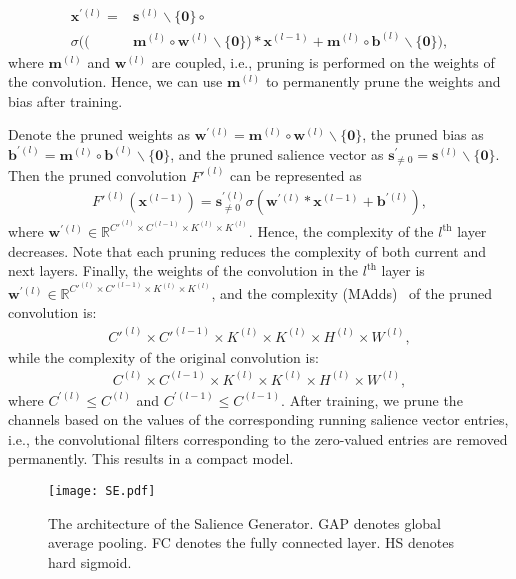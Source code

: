 \documentclass[lettersize,journal]{IEEEtran}
\begin{document}
\begin{equation}
    \begin{aligned}
  \boldsymbol{x}^{\prime(l)} =
  &\boldsymbol{s}^{(l)}\backslash\{\boldsymbol{0}\}\circ\\
  \sigma((&\boldsymbol{m}^{(l)}\circ\boldsymbol{w}^{(l)}\backslash\{\boldsymbol{0}\})*\boldsymbol{x}^{(l-1)}+\boldsymbol{m}^{(l)}\circ\boldsymbol{b}^{(l)}\backslash\{\boldsymbol{0}\}),
\end{aligned}
\end{equation}
where $\boldsymbol{m}^{(l)}$ and $\boldsymbol{w}^{(l)}$ are coupled, i.e., pruning is performed on the weights of the convolution. 
Hence, we can use $\boldsymbol{m}^{(l)}$ to permanently prune the weights and bias after training. 


Denote the pruned weights as $\boldsymbol{w}^{\prime(l)}=\boldsymbol{m}^{(l)}\circ\boldsymbol{w}^{(l)}\backslash\{\boldsymbol{0}\}$, the pruned bias as $\boldsymbol{b}^{\prime(l)}=\boldsymbol{m}^{(l)}\circ\boldsymbol{b}^{(l)}\backslash\{\boldsymbol{0}\}$, and the pruned salience vector as $\boldsymbol{s}^\prime_{\ne 0}=\boldsymbol{s}^{(l)}\backslash\{\boldsymbol{0}\}$. Then the pruned convolution $F'^{(l)}$ can be represented as 
\begin{align}
  F'^{(l)}(\boldsymbol{x}^{(l-1)})=\boldsymbol{s}^{\prime(l)}_{\ne 0}\sigma(\boldsymbol{w}^{\prime(l)}*\boldsymbol{x}^{(l-1)}+\boldsymbol{b}^{\prime(l)}),
\end{align}
where $\boldsymbol{w}^{\prime(l)}\in\mathbb{R}^{C'^{(l)}\times C^{(l-1)}\times K^{(l)}\times K^{(l)}}$. Hence, the complexity of the $l^{\text{th}}$ layer decreases. Note that each pruning reduces the complexity of both current and next layers. Finally, the weights of the convolution in the $l^{\text{th}}$ layer is $\boldsymbol{w}^{\prime(l)} \in \mathbb{R}^{C'^{(l)}\times C'^{(l-1)}\times K^{(l)}\times K^{(l)}}$, and the complexity (MAdds)~\cite{howard2017efficient} of the pruned convolution is: 
\begin{align}
C'^{(l)}\times C'^{(l-1)}\times K^{(l)}\times K^{(l)}\times H^{(l)}\times W^{(l)},
\label{eq:eq13}
\end{align}
while the complexity of the original convolution is:
\begin{align}
C^{(l)}\times C^{(l-1)}\times K^{(l)}\times K^{(l)}\times H^{(l)}\times W^{(l)},
\end{align}
where $C^{\prime(l)}\le C^{(l)}$ and $C^{\prime(l-1)}\le C^{(l-1)}$. 
After training, we prune the channels based on the values of the corresponding running
salience vector entries, i.e., the convolutional filters corresponding to the zero-valued entries are removed permanently. This results in a compact model. 
\begin{figure}[tp]
  \center
  \texttt{[image: SE.pdf]} 
  \caption{
  The architecture of the Salience Generator. 
  GAP denotes global average pooling. FC denotes the fully connected layer. HS denotes hard sigmoid. }
  \label{Fig.SE}
 \vspace{-3mm}
\end{figure}
\end{document}
